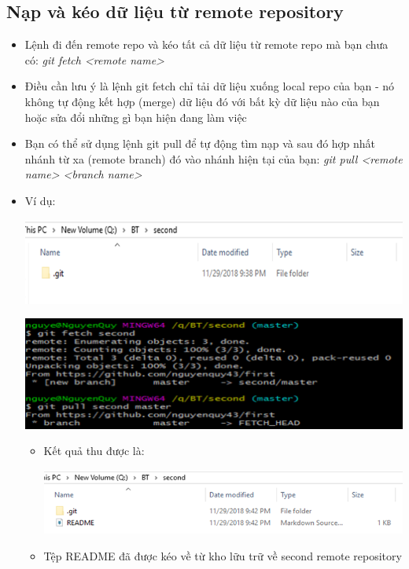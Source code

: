 \documentclass[12pt,a4paper]{report}
\begin{document}
\subsection{Nạp và kéo dữ liệu từ remote repository} 
\begin{itemize}
\item Lệnh đi đến remote repo và kéo tất cả dữ liệu từ remote repo mà bạn chưa có: {\it git fetch <remote name>}
\item Điều cần lưu ý là lệnh git fetch chỉ tải dữ liệu xuống  local repo của bạn - nó không tự động kết hợp (merge) dữ liệu đó với bất kỳ dữ liệu nào của bạn hoặc sửa đổi những gì bạn hiện đang làm việc
\item Bạn có thể sử dụng lệnh git pull để tự động tìm nạp và sau đó hợp nhất nhánh từ xa (remote branch) đó vào nhánh hiện tại của bạn: {\it git pull <remote name> <branch name>}
\item Ví dụ: 
	
	\includegraphics[width=0.8\linewidth]{screenshot035}

	\label{fig:screenshot035}

	\includegraphics[width=0.8\linewidth]{screenshot036}

	\label{fig:screenshot036}

\begin{itemize}
\item Kết quả thu được là: 

	\includegraphics[width=0.8\linewidth]{screenshot037}

	\label{fig:screenshot037}

\item Tệp README đã được kéo về từ kho lữu trữ về second remote repository
\end{itemize}
\end{itemize}
\end{document}
